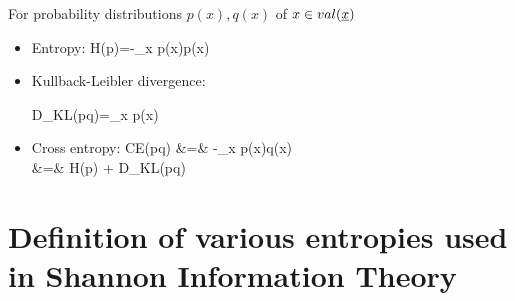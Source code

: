 For probability distributions $p(x), q(x)$ of $x\in val(\rvx)$
\begin{itemize}
\item
Entropy:
\beq
H(p)=-\sum_x p(x)\ln p(x)
\eeq

\item
Kullback-Leibler divergence:

\beq
D_{KL}(p\parallel q)=\sum_{x} p(x)\ln {}
\eeq
\item
Cross entropy:
\beqa
CE(p\parallel q) &=& -\sum_x p(x)\ln q(x)\\
&=& H(p) + D_{KL}(p\parallel q)
\eeqa
\end{itemize}

\section{Definition of various
entropies used in Shannon Information Theory}
\label{sec-def-various-ents}

